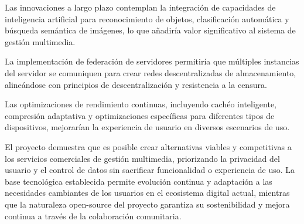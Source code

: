 Las innovaciones a largo plazo contemplan la integración de capacidades de inteligencia artificial para reconocimiento de objetos, clasificación automática y búsqueda semántica de imágenes, lo que añadiría valor significativo al sistema de gestión multimedia.

La implementación de federación de servidores permitiría que múltiples instancias del servidor se comuniquen para crear redes descentralizadas de almacenamiento, alineándose con principios de descentralización y resistencia a la censura.

Las optimizaciones de rendimiento continuas, incluyendo cachéo inteligente, compresión adaptativa y optimizaciones específicas para diferentes tipos de dispositivos, mejorarían la experiencia de usuario en diversos escenarios de uso.

El proyecto demuestra que es posible crear alternativas viables y competitivas a los servicios comerciales de gestión multimedia, priorizando la privacidad del usuario y el control de datos sin sacrificar funcionalidad o experiencia de uso. La base tecnológica establecida permite evolución continua y adaptación a las necesidades cambiantes de los usuarios en el ecosistema digital actual, mientras que la naturaleza open-source del proyecto garantiza su sostenibilidad y mejora continua a través de la colaboración comunitaria.
